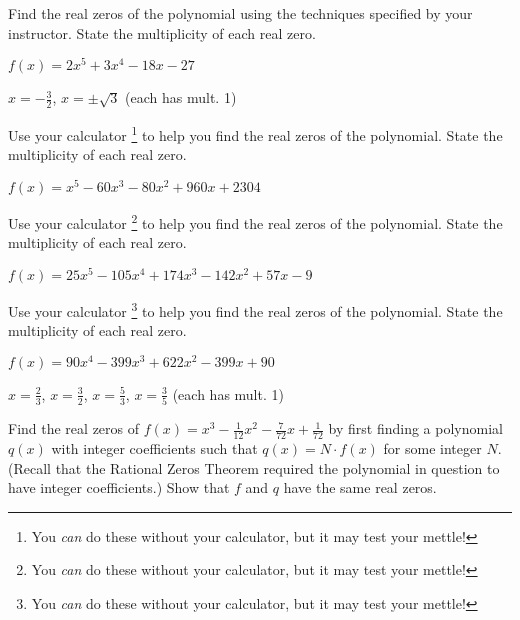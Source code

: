 \documentclass{ximera}
\begin{document}
\begin{problem}\label{findrealzerosexerlast}
Find the real zeros of the polynomial using the techniques specified by your instructor.  State the multiplicity of each real zero.

$f(x) = 2x^5+3x^4-18x-27$ 

$x = -\frac{3}{2}$, $x = \pm \sqrt{3}$ (each has mult. 1)
\end{problem}

\begin{problem}\label{realzeroswcalcfirst}
Use your calculator \footnote{You \textit{can} do these without your calculator, but it may test your mettle!} to help you find the real zeros of the polynomial.  State the multiplicity of each real zero.

$f(x) = x^{5} - 60x^{3} - 80x^{2} + 960x + 2304$
\end{problem}

\begin{problem}
Use your calculator \footnote{You \textit{can} do these without your calculator, but it may test your mettle!} to help you find the real zeros of the polynomial.  State the multiplicity of each real zero.

$f(x) = 25x^{5} - 105x^{4} + 174x^{3} - 142x^{2} + 57x - 9$
\end{problem}

\begin{problem}\label{realzeroswcalclast}
Use your calculator \footnote{You \textit{can} do these without your calculator, but it may test your mettle!} to help you find the real zeros of the polynomial.  State the multiplicity of each real zero.

$f(x) = 90x^{4} - 399x^{3} + 622x^{2} - 399x + 90$

\begin{solution}
$x = \frac{2}{3}$, $x = \frac{3}{2}$, $x = \frac{5}{3}$, $x = \frac{3}{5}$ (each has mult. 1)
\end{solution}
\end{problem}

\begin{problem}
Find the real zeros of $f(x) = x^{3} - \frac{1}{12}x^{2} - \frac{7}{72}x + \frac{1}{72}$ by first finding a polynomial $q(x)$ with integer coefficients such that $q(x) = N \cdot f(x)$ for some integer $N$.  (Recall that the Rational Zeros Theorem required the polynomial in question to have integer coefficients.) Show that $f$ and $q$ have the same real zeros.
\end{problem}
\end{document}
